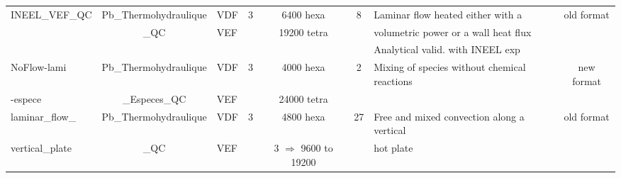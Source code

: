 \begin{table}[H]
\begin{centering}
\begin{tabular}{lclccclc}
\hline
\rowcolor{Peach!20}INEEL\_VEF\_QC & Pb\_Thermohydraulique & VDF & 3 & 6400 hexa & 8 & Laminar flow heated either with a & old format \\ 
\rowcolor{Peach!20} & \_QC & VEF &  & 19200 tetra & & volumetric power or a wall heat flux & \\
\rowcolor{Peach!20} & & &  & & & Analytical valid. with INEEL exp & \\
\hline
\rowcolor{Peach!20}NoFlow-lami & Pb\_Thermohydraulique & VDF & 3 & 4000 hexa & 2 & Mixing of species without chemical reactions & new format \\ 
\rowcolor{Peach!20}-espece & \_Especes\_QC & VEF & & 24000 tetra & &  & \\
\hline
\rowcolor{Peach!20}laminar\_flow\_ & Pb\_Thermohydraulique & VDF & 3 & 4800 hexa & 27 & Free and mixed convection along a vertical  & old format \\
\rowcolor{Peach!20}vertical\_plate & \_QC & VEF & & 3 $\Rightarrow$ 9600 to 19200 & & hot plate & \\
\hline
\end{tabular}
\end{centering}
\end{table}

\newpage

